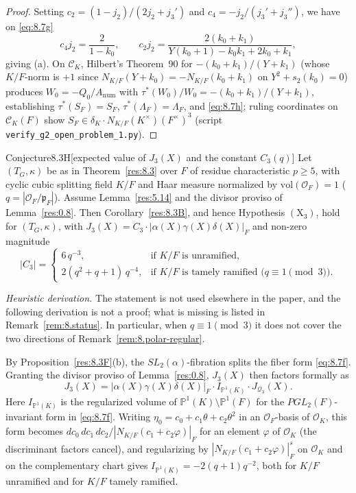 \documentclass[12pt,letterpaper]{amsart}
\theoremstyle{plain}
\theoremstyle{definition}
\theoremstyle{remark}
\theoremstyle{definition}
\newcommand{\OF}{\mathcal{O}_F}
\begin{document}
\begin{proof}
Setting $c_2=(1-j_2)/(2j_2+j_3')$ and $c_4=-j_2/(j_3'+j_3'')$, we have on
\eqref{eq:8.7g}
\[
c_4j_2=\frac{2}{1-k_0},\qquad
c_2j_2=\frac{2(k_0+k_1)}{Y(k_0+1)-k_0k_1+2k_0+k_1},
\]
giving (a). On $\mathcal C_K$, Hilbert's Theorem~90 for
$-(k_0+k_1)/(Y+k_1)$ (whose $K/F$-norm is $+1$ since
$N_{K/F}(Y+k_0)=-N_{K/F}(k_0+k_1)$ on $Y^2+s_2(k_0)=0$) produces
$W_0=-Q_0/A_{\mathrm{num}}$ with $\tau^*(W_0)/W_0=-(k_0+k_1)/(Y+k_1)$,
establishing $\tau^*(S_F)=S_F$, $\tau^*(\Lambda_F)=\Lambda_F$, and
\eqref{eq:8.7h}; ruling coordinates on $\mathcal C_K(F)$ show
$S_F\in\delta_K\cdot N_{K/F}(K^\times)(F^\times)^3$ (script
\texttt{verify\_g2\_open\_problem\_1.py}).
\end{proof}

\begin{res}{Conjecture}{8.3H}[expected value of $J_3(X)$ and the constant $C_3(q)$]\label{res:8.3H}
Let $(T_G,\kappa)$ be as in Theorem~\ref{res:8.3} over $F$ of residue
characteristic $p\ge 5$, with cyclic cubic splitting field $K/F$ and Haar
measure normalized by $\mathrm{vol}(\OF)=1$ ($q=|\OF/\mathfrak p_F|$). Assume
Lemma~\ref{res:5.14} and the divisor proviso of Lemma~\ref{res:0.8}. Then
Corollary~\ref{res:8.3B}, and hence Hypothesis $(\mathrm X_3)$, hold for
$(T_G,\kappa)$, with $J_3(X)=C_3\cdot|\alpha(X)\gamma(X)\delta(X)|_F$ and
non-zero magnitude
\begin{equation}\tag{8.8}\label{eq:8.8}
|C_3|=\begin{cases}
6\,q^{-3}, & \text{if $K/F$ is unramified},\\[4pt]
2(q^2+q+1)\,q^{-4}, & \text{if $K/F$ is tamely ramified ($q\equiv 1\pmod 3$)}.
\end{cases}
\end{equation}
\end{res}

\emph{Heuristic derivation.} The statement is not used elsewhere in the paper,
and the following derivation is not a proof; what is missing is listed in
Remark~\ref{rem:8.status}. In particular, when $q\equiv1\pmod3$ it does not
cover the two directions of Remark~\ref{rem:8.polar-regular}.

By Proposition~\ref{res:8.3F}(b), the $SL_2(\alpha)$-fibration splits the
fiber form \eqref{eq:8.7f}. Granting the divisor proviso of
Lemma~\ref{res:0.8}, $J_3(X)$ then factors formally as
\[
J_3(X)=|\alpha(X)\gamma(X)\delta(X)|_F\cdot I_{\mathbb P^1(K)}\cdot
J_{\mathcal Q_3}(X).
\]
Here $I_{\mathbb P^1(K)}$ is the regularized volume of
$\mathbb P^1(K)\setminus\mathbb P^1(F)$ for the $PGL_2(F)$-invariant form in
\eqref{eq:8.7f}. Writing $\eta_0=c_0+c_1\theta+c_2\theta^2$ in an
$\OF$-basis of $\mathcal O_K$, this form becomes
$dc_0\,dc_1\,dc_2/|N_{K/F}(c_1+c_2\varphi)|_F$ for an element $\varphi$ of
$\mathcal O_K$ (the discriminant factors cancel), and regularizing by
$|N_{K/F}(c_1+c_2\varphi)|_F^{s}$ on $\mathcal O_K$ and on the complementary
chart gives $I_{\mathbb P^1(K)}=-2(q+1)q^{-2}$, both for $K/F$ unramified and
for $K/F$ tamely ramified.
\end{document}
